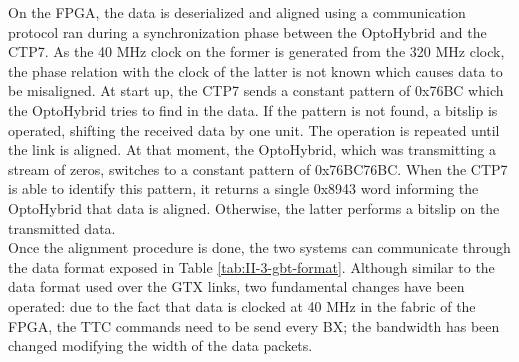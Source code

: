     On the FPGA, the data is deserialized and aligned using a communication protocol ran during a synchronization phase between the OptoHybrid and the CTP7. As the 40 MHz clock on the former is generated from the 320 MHz clock, the phase relation with the clock of the latter is not known which causes data to be misaligned. At start up, the CTP7 sends a constant pattern of 0x76BC which the OptoHybrid tries to find in the data. If the pattern is not found, a bitslip is operated, shifting the received data by one unit. The operation is repeated until the link is aligned. At that moment, the OptoHybrid, which was transmitting a stream of zeros, switches to a constant pattern of 0x76BC76BC. When the CTP7 is able to identify this pattern, it returns a single 0x8943 word informing the OptoHybrid that data is aligned. Otherwise, the latter performs a bitslip on the transmitted data. \\

    Once the alignment procedure is done, the two systems can communicate through the data format exposed in Table \ref{tab:II-3-gbt-format}. Although similar to the data format used over the GTX links, two fundamental changes have been operated: due to the fact that data is clocked at 40 MHz in the fabric of the FPGA, the TTC commands need to be send every BX; the bandwidth has been changed modifying the width of the data packets. \\

